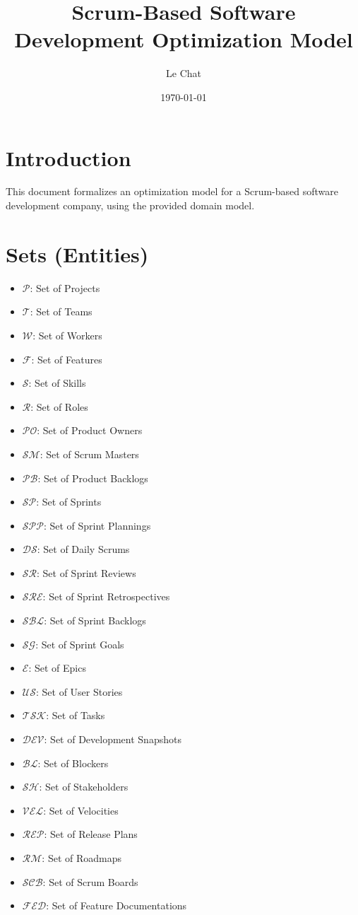 \documentclass{article}
\title{Scrum-Based Software Development Optimization Model}
\author{Le Chat}
\date{\today}
\begin{document}
\maketitle
\tableofcontents

\section{Introduction}
This document formalizes an optimization model for a Scrum-based software development company, using the provided domain model.

\section{Sets (Entities)}
\begin{itemize}
    \item $\mathcal{P}$: Set of Projects
    \item $\mathcal{T}$: Set of Teams
    \item $\mathcal{W}$: Set of Workers
    \item $\mathcal{F}$: Set of Features
    \item $\mathcal{S}$: Set of Skills
    \item $\mathcal{R}$: Set of Roles
    \item $\mathcal{PO}$: Set of Product Owners
    \item $\mathcal{SM}$: Set of Scrum Masters
    \item $\mathcal{PB}$: Set of Product Backlogs
    \item $\mathcal{SP}$: Set of Sprints
    \item $\mathcal{SPP}$: Set of Sprint Plannings
    \item $\mathcal{DS}$: Set of Daily Scrums
    \item $\mathcal{SR}$: Set of Sprint Reviews
    \item $\mathcal{SRE}$: Set of Sprint Retrospectives
    \item $\mathcal{SBL}$: Set of Sprint Backlogs
    \item $\mathcal{SG}$: Set of Sprint Goals
    \item $\mathcal{E}$: Set of Epics
    \item $\mathcal{US}$: Set of User Stories
    \item $\mathcal{TSK}$: Set of Tasks
    \item $\mathcal{DEV}$: Set of Development Snapshots
    \item $\mathcal{BL}$: Set of Blockers
    \item $\mathcal{SH}$: Set of Stakeholders
    \item $\mathcal{VEL}$: Set of Velocities
    \item $\mathcal{REP}$: Set of Release Plans
    \item $\mathcal{RM}$: Set of Roadmaps
    \item $\mathcal{SCB}$: Set of Scrum Boards
    \item $\mathcal{FED}$: Set of Feature Documentations
\end{itemize}
\end{document}
